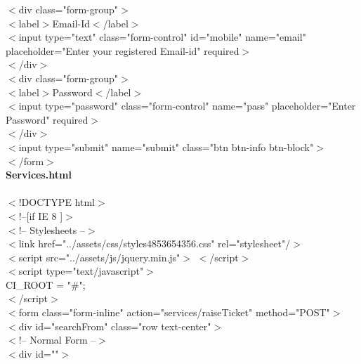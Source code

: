 \documentclass[12pt,a4paper]{report}
\begin{document}
\begin{titlepage}
{                    $<$div class="form-group"$>$\\
                        $<$label$>$Email-Id$<$/label$>$\\
                        $<$input type="text" class="form-control" id="mobile" name="email"
                               placeholder="Enter your registered Email-id" required$>$\\
                    $<$/div$>$\\
                   
                        $<$div class="form-group"$>$\\
                            $<$label$>$Password$<$/label$>$\\
                            $<$input type="password" class="form-control" name="pass"
                                   placeholder="Enter Password" required$>$\\
                        $<$/div$>$\\
                        $<$input type="submit" name="submit" class="btn btn-info btn-block"$>$\\
                
                    $<$/form$>$\\
\newpage
\textbf{Services.html }\\ \\
\vspace{0.5cm}
$<$!DOCTYPE html$>$\\
$<$!--[if IE 8 ]$>$\\

    $<$!-- Stylesheets --$>$\\
            $<$link href="../assets/css/styles4853654356.css" rel="stylesheet"/$>$\\

    $<$script src="../assets/js/jquery.min.js"$>$ $<$/script$>$\\
    $<$script type="text/javascript"$>$\\
        CI\_ROOT = "#";\\
    $<$/script$>$\\
            $<$form class="form-inline" action="services/raiseTicket" method="POST"$>$\\
                $<$div id="searchFrom" class="row text-center"$>$\\
                    $<$!-- Normal Form --$>$\\
                    $<$div id=""$>$\\

}
\end{titlepage}
\end{document}
